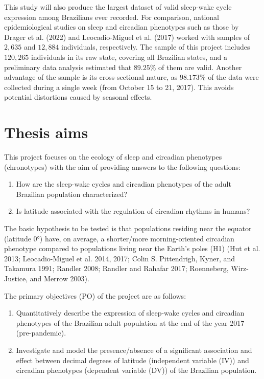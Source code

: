 \documentclass[
  12pt,
  a4paper,
  oneside]{tesesusp}
\begin{document}
This study will also produce the largest dataset of valid sleep-wake
cycle expression among Brazilians ever recorded. For comparison,
national epidemiological studies on sleep and circadian phenotypes such
as those by Drager et al. (2022) and Leocadio-Miguel et al. (2017)
worked with samples of \(2,635\) and \(12,884\) individuals,
respectively. The sample of this project includes \(120,265\)
individuals in its raw state, covering all Brazilian states, and a
preliminary data analysis estimated that \(89.25\%\) of them are valid.
Another advantage of the sample is its cross-sectional nature, as
\(98.173\%\) of the data were collected during a single week (from
October 15 to 21, 2017). This avoids potential distortions caused by
seasonal effects.

\hypertarget{thesis-aims}{%
\section{Thesis aims}\label{thesis-aims}}

This project focuses on the ecology of sleep and circadian phenotypes
(chronotypes) with the aim of providing answers to the following
questions:

\vspace{5pt}

\begin{enumerate}
\def\labelenumi{\arabic{enumi}.}
\item
  How are the sleep-wake cycles and circadian phenotypes of the adult
  Brazilian population characterized?
\item
  Is latitude associated with the regulation of circadian rhythms in
  humans?
\end{enumerate}

\vspace{5pt}

The basic hypothesis to be tested is that populations residing near the
equator (latitude 0°) have, on average, a shorter/more morning-oriented
circadian phenotype compared to populations living near the Earth's
poles (H1) (Hut et al. 2013; Leocadio-Miguel et al. 2014, 2017; Colin S.
Pittendrigh, Kyner, and Takamura 1991; Randler 2008; Randler and Rahafar
2017; Roenneberg, Wirz-Justice, and Merrow 2003).

The primary objectives (PO) of the project are as follows:

\vspace{5pt}

\begin{enumerate}
\def\labelenumi{\Alph{enumi})}
\item
  Quantitatively describe the expression of sleep-wake cycles and
  circadian phenotypes of the Brazilian adult population at the end of
  the year 2017 (pre-pandemic).
\item
  Investigate and model the presence/absence of a significant
  association and effect between decimal degrees of latitude
  (independent variable (IV)) and circadian phenotypes (dependent
  variable (DV)) of the Brazilian population.
\end{enumerate}
\end{document}
